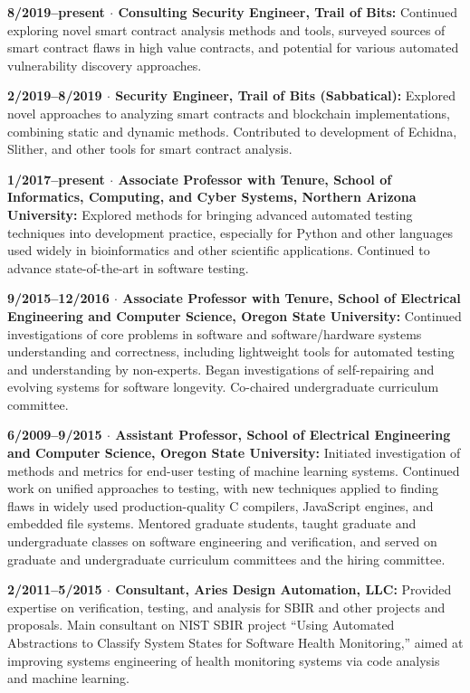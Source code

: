 \documentclass[ComputerScience]{vita}
\begin{document}
\begin{vita}
\begin{Experience}
\item {\bf 8/2019--present $\cdot$ Consulting Security Engineer, Trail of Bits:} Continued exploring novel smart contract analysis methods and tools, surveyed sources of smart contract flaws in high value contracts, and potential for various automated vulnerability discovery approaches. 

\item {\bf 2/2019--8/2019 $\cdot$ Security Engineer, Trail of Bits
    (Sabbatical):} Explored novel approaches to analyzing smart
  contracts and blockchain implementations, combining static and dynamic
  methods.  Contributed to development of Echidna, Slither, and other
  tools for smart contract analysis.

\item {\bf 1/2017--present $\cdot$ Associate Professor with Tenure, School of Informatics, Computing, and Cyber Systems, Northern Arizona University:} Explored methods for bringing advanced automated testing techniques into development practice, especially for Python and other languages used widely in bioinformatics and other scientific applications.  Continued to advance state-of-the-art in software testing.

  \item {\bf 9/2015--12/2016 $\cdot$ Associate Professor with Tenure, School of Electrical Engineering and Computer Science, Oregon State University:} Continued investigations of core problems in software and software/hardware systems understanding and correctness, including lightweight tools for automated testing and understanding by non-experts.  Began investigations of self-repairing and evolving systems for software longevity.  Co-chaired undergraduate curriculum committee.

  \item {\bf 6/2009--9/2015 $\cdot$ Assistant Professor, School of
    Electrical Engineering and Computer Science, Oregon State
    University:} Initiated investigation of methods and metrics for
    end-user testing of machine learning systems.  Continued work
    on unified approaches to testing, with new techniques applied to finding flaws in widely used production-quality C compilers, JavaScript engines, and embedded file systems.  Mentored graduate
    students, taught graduate and undergraduate classes on software
    engineering and verification, and served on graduate and undergraduate curriculum committees and the hiring committee.

  \item {\bf 2/2011--5/2015 $\cdot$ Consultant, Aries Design Automation, LLC:} Provided expertise on verification, testing, and analysis for SBIR and other projects and proposals.  Main consultant on NIST SBIR project ``Using Automated Abstractions to Classify System States for Software Health Monitoring,'' aimed at improving systems engineering of health monitoring systems via code analysis and machine learning.


\end{Experience}
\end{vita}
\end{document}
